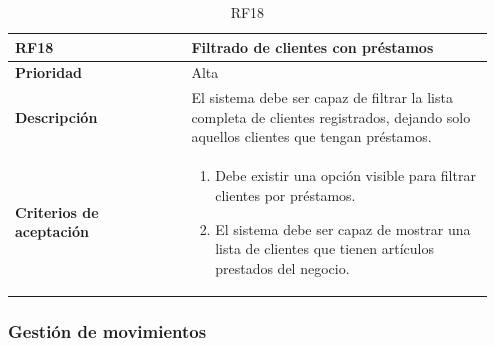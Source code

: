 \begin{table}[H]
	\centering %
	\begin{tabular}{|p{0.35\linewidth}|p{0.6\linewidth}|}
		\hline
		\rowcolor{grayshade} \textbf{RF18} & \textbf{Filtrado de clientes con préstamos} \\
		\hline
		\textbf{Prioridad} & Alta \\
		\hline
		\textbf{Descripción} & El sistema debe ser capaz de filtrar la lista completa de clientes registrados, dejando solo aquellos clientes que tengan préstamos.\\
		\hline
		\vspace{0.5mm}
		\textbf{Criterios de aceptación} & 
		\begin{minipage}[t]{0.9\linewidth}
			\begin{enumerate}
				\item Debe existir una opción visible para filtrar clientes por préstamos.
				\item El sistema debe ser capaz de mostrar una lista de clientes que tienen artículos prestados del negocio.  
			\end{enumerate}
			\vspace{2mm}
		\end{minipage} \\
		\hline
	\end{tabular}
	\caption{RF18}
\end{table}


\subsubsection{Gestión de movimientos}

